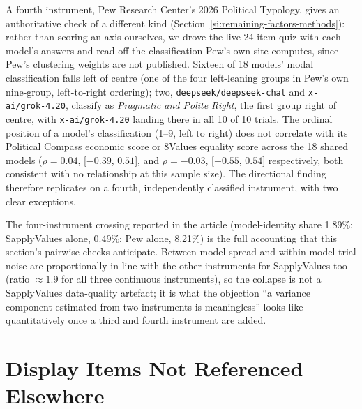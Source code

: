 \documentclass[11pt]{article}
\begin{document}
A fourth instrument, Pew Research Center's 2026 Political Typology, gives
an authoritative check of a different kind (Section~\ref{si:remaining-factors-methods}):
rather than scoring an axis ourselves, we drove the live 24-item quiz with
each model's answers and read off the classification Pew's own site
computes, since Pew's clustering weights are not published. Sixteen of 18
models' modal classification falls left of centre (one of the four
left-leaning groups in Pew's own nine-group, left-to-right ordering);
two, \texttt{deepseek/deepseek-chat} and \texttt{x-ai/grok-4.20}, classify
as \emph{Pragmatic and Polite Right}, the first group right of centre, with
\texttt{x-ai/grok-4.20} landing there in all 10 of 10 trials. The ordinal
position of a model's classification (1--9, left to right) does not
correlate with its Political Compass economic score or 8Values equality
score across the 18 shared models ($\rho=0.04$, [$-0.39$, $0.51$], and
$\rho=-0.03$, [$-0.55$, $0.54$] respectively, both consistent with no
relationship at this sample size). The directional finding therefore
replicates on a fourth, independently classified instrument, with two clear
exceptions.

The four-instrument crossing reported in the article (model-identity share
1.89\%; SapplyValues alone, 0.49\%; Pew alone, 8.21\%) is the full
accounting that this section's pairwise checks anticipate. Between-model
spread and within-model trial noise are proportionally in line with the
other instruments for SapplyValues too (ratio $\approx 1.9$ for all three
continuous instruments), so the collapse is not a SapplyValues
data-quality artefact; it is what the objection ``a variance component
estimated from two instruments is meaningless'' looks like quantitatively
once a third and fourth instrument are added.

\section{Display Items Not Referenced Elsewhere}
\end{document}

